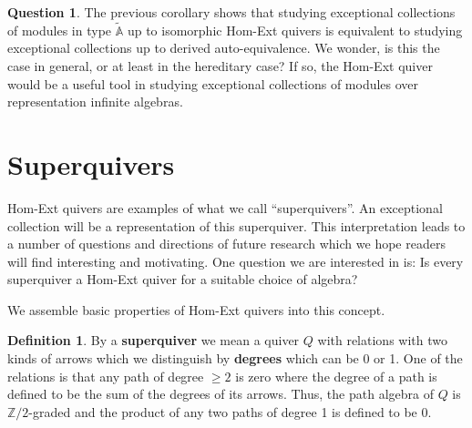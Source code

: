 \documentclass[12pt]{amsart}
\theoremstyle{plain}
\theoremstyle{definition}
\newtheorem{defn}{Definition}[section]
\newtheorem{question}{Question}
\theoremstyle{remark}
\begin{document}
\begin{question}
The previous corollary shows that studying exceptional collections of modules in type $\tilde{\mathbb{A}}$ up to {\color{black} isomorphic} Hom-Ext quivers is {\color{black} equivalent} to studying exceptional collections up to derived auto-equivalence. We wonder, is this the case in general, or at least in the hereditary case? If so, the Hom-Ext quiver would be a useful tool in studying exceptional collections of modules over representation infinite algebras.
\end{question}

\section{Superquivers} \label{sec: superquivers}
{Hom-Ext quivers are examples of what we call ``superquivers''. An exceptional collection will be a representation of this superquiver. This interpretation leads to a number of questions and directions of future research which we hope readers will find interesting and motivating. One question we are interested in is: Is every superquiver a Hom-Ext quiver for a suitable choice of algebra?

We assemble basic properties of Hom-Ext quivers into this concept.

\begin{defn}\label{defn: superquiver} By a \textbf{superquiver} we mean a quiver $Q$ with relations with two kinds of arrows which we distinguish by \textbf{degrees} which can be 0 or 1. {\color{black}One of the relations is that any path of degree $\ge2$ is zero} where the degree of a path is defined to be the sum of the degrees of its arrows. Thus, the path algebra of $Q$ is $\mathbb Z/2$-graded and the product of any two paths of degree 1 is defined to be 0.


\end{defn}}
\end{document}
